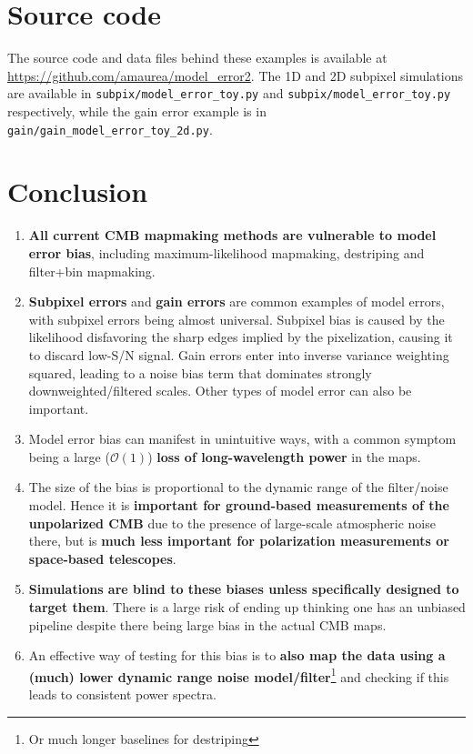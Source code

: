 \documentclass[twocolumn,apj]{aastex63}
\begin{document}
\section{Source code}
\label{sec:code}
The source code and data files behind these examples is available at
\url{https://github.com/amaurea/model_error2}. The 1D and 2D subpixel
simulations are available in \verb|subpix/model_error_toy.py| and \verb|subpix/model_error_toy.py|
respectively, while the gain error example is in
\verb|gain/gain_model_error_toy_2d.py|.

\section{Conclusion}

\begin{enumerate}
	\item \textbf{All current CMB mapmaking methods are vulnerable to model error bias},
		including maximum-likelihood mapmaking, destriping and filter+bin mapmaking.
	\item \textbf{Subpixel errors} and \textbf{gain errors} are common examples of
		model errors, with subpixel errors being almost universal.
		Subpixel bias is caused by the likelihood disfavoring the sharp edges implied by
		the pixelization, causing it to discard low-S/N signal. Gain errors enter into inverse
		variance weighting squared, leading to a noise bias term that dominates strongly downweighted/filtered scales.
		Other types of model error can also be important.
	\item Model error bias can manifest in unintuitive ways, with a common symptom
		being a large ($\mathcal{O}(1)$) \textbf{loss of long-wavelength power} in the maps.
	\item The size of the bias is proportional to the dynamic range of the filter/noise model.
		Hence it is \textbf{important for ground-based measurements of the unpolarized CMB}
		due to the presence of large-scale atmospheric noise there, but is \textbf{much less
		important for polarization measurements or space-based telescopes}.
	\item \textbf{Simulations are blind to these biases unless specifically designed to
		target them}. There is a large risk of ending up thinking one has an unbiased
		pipeline despite there being large bias in the actual CMB maps.
	\item An effective way of testing for this bias is to \textbf{also map the data using a
		(much) lower dynamic range noise model/filter}\footnote{Or much longer baselines for destriping}
		and checking if this leads to consistent power spectra.
\end{enumerate}
\end{document}
